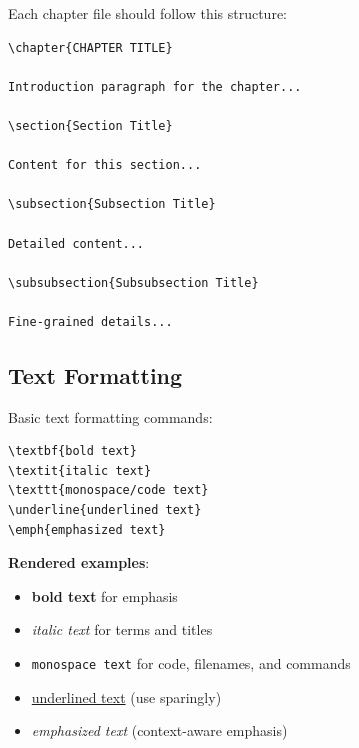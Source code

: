Each chapter file should follow this structure:

\begin{verbatim}
\chapter{CHAPTER TITLE}

Introduction paragraph for the chapter...

\section{Section Title}

Content for this section...

\subsection{Subsection Title}

Detailed content...

\subsubsection{Subsubsection Title}

Fine-grained details...
\end{verbatim}

\subsection*{Text Formatting}

Basic text formatting commands:

\begin{verbatim}
\textbf{bold text}
\textit{italic text}
\texttt{monospace/code text}
\underline{underlined text}
\emph{emphasized text}
\end{verbatim}

\textbf{Rendered examples}:
\begin{itemize}
    \item \textbf{bold text} for emphasis
    \item \textit{italic text} for terms and titles
    \item \texttt{monospace text} for code, filenames, and commands
    \item \underline{underlined text} (use sparingly)
    \item \emph{emphasized text} (context-aware emphasis)
\end{itemize}

